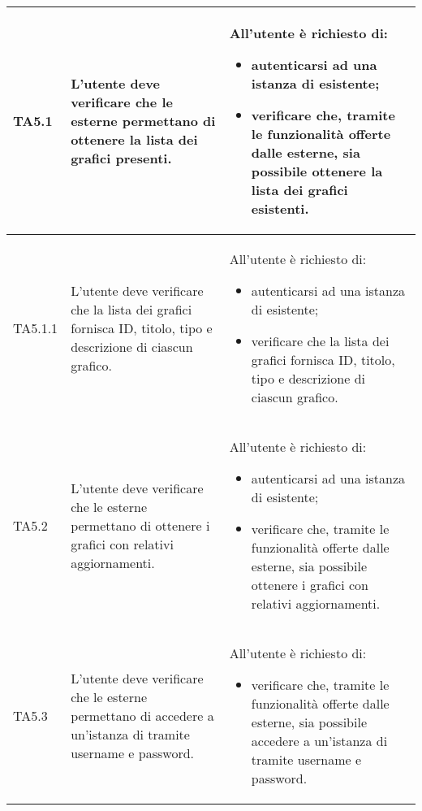 \begin{longtabu}{| X[0.5] | X | X |}
	TA5.1 & L'utente  deve verificare che le  esterne permettano di ottenere la lista dei grafici presenti.

		& All'utente  è richiesto di:
		\begin{itemize}
			\item autenticarsi ad una istanza di \projectname{} esistente;
			\item verificare che, tramite le funzionalità offerte dalle  esterne, sia possibile ottenere la lista dei grafici esistenti.
		\end{itemize}
\\ \hline

	TA5.1.1 & L'utente  deve verificare che la lista dei grafici fornisca ID, titolo, tipo e descrizione di ciascun grafico.
		
		& All'utente  è richiesto di:
		\begin{itemize}
			\item autenticarsi ad una istanza di \projectname{} esistente;
			\item verificare che la lista dei grafici fornisca ID, titolo, tipo e descrizione di ciascun grafico.
		\end{itemize}
\\ \hline

	TA5.2 & L'utente  deve verificare che le  esterne permettano di ottenere i grafici con relativi aggiornamenti.
		
		& All'utente  è richiesto di:
		\begin{itemize}
			\item autenticarsi ad una istanza di \projectname{} esistente;
			\item verificare che, tramite le funzionalità offerte dalle  esterne, sia possibile ottenere i grafici con relativi aggiornamenti.
		\end{itemize}
\\ \hline

	TA5.3 & L'utente  deve verificare che le  esterne permettano di accedere a un'istanza di \projectname{} tramite username e password.
		
		& All'utente  è richiesto di:
		\begin{itemize}
			\item verificare che, tramite le funzionalità offerte dalle  esterne, sia possibile accedere a un'istanza di \projectname{} tramite username e password.
		\end{itemize}
\\ \hline


\end{longtabu}
